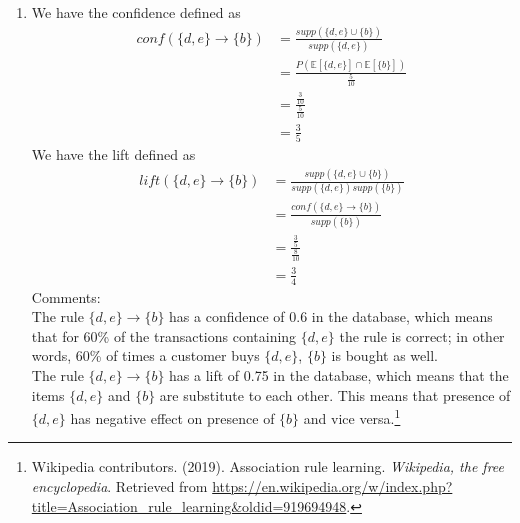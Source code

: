 \documentclass[10pt]{article}
\begin{document}
\begin{enumerate}[1)]
\item
We have the confidence defined as
\begin{align*}
conf(\{d,e\}\to\{b\})&=\frac{supp(\{d,e\}\cup\{b\})}{supp(\{d,e\})}\\
&=\frac{P(\mathbb{E}[\{d,e\}]\cap\mathbb{E}[\{b\}])}{\frac{5}{10}}\\
&=\frac{\frac{3}{10}}{\frac{5}{10}}\\
&=\frac{3}{5}
\end{align*}
We have the lift defined as
\begin{align*}
lift(\{d,e\}\to\{b\})&=\frac{supp(\{d,e\}\cup\{b\})}{supp(\{d,e\})supp(\{b\})}\\
&=\frac{conf(\{d,e\}\to\{b\})}{supp(\{b\})}\\
&=\frac{\frac{3}{5}}{\frac{8}{10}}\\
&=\frac{3}{4}
\end{align*}
Comments:\\
The rule $\{d,e\}\to\{b\}$ has a confidence of 0.6 in the database, which means that for 60\% of the transactions containing $\{d,e\}$ the rule is correct; in other words, 60\% of times a customer buys $\{d,e\}$, $\{b\}$ is bought as well.\\
The rule $\{d,e\}\to\{b\}$ has a lift of 0.75 in the database, which means that the items $\{d,e\}$ and $\{b\}$ are substitute to each other. This means that presence of $\{d,e\}$ has negative effect on presence of $\{b\}$ and vice versa.\footnote{ Wikipedia contributors. (2019). Association rule learning. \textit{Wikipedia, the free encyclopedia}. Retrieved from \url{https://en.wikipedia.org/w/index.php?title=Association_rule_learning&oldid=919694948}.}

\end{enumerate}
\vspace{3mm}
\end{document}
